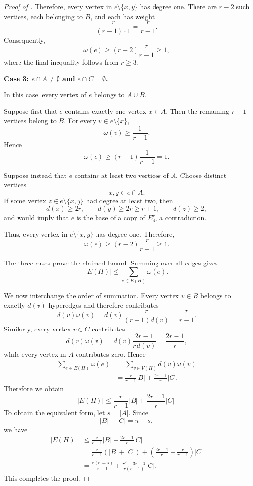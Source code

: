 \documentclass[11pt,a4paper]{article}
\theoremstyle{definition}
\theoremstyle{remark}
\begin{document}
\begin{proof}[Proof of ]
Therefore, every vertex in \(e\setminus\{x,y\}\) has degree one.
There are \(r-2\) such vertices, each belonging to \(B\), and each has
weight
$$
\frac{r}{(r-1)\cdot1}
=
\frac{r}{r-1}.
$$
Consequently,
$$
\omega(e)
\geq
(r-2)\frac{r}{r-1}
\geq1,
$$
where the final inequality follows from \(r\geq3\).

\medskip
\noindent
\textbf{Case 3: \(e\cap A\neq\emptyset\) and \(e\cap C=\emptyset\).}

In this case, every vertex of \(e\) belongs to \(A\cup B\).

Suppose first that \(e\) contains exactly one vertex \(x\in A\). Then
the remaining \(r-1\) vertices belong to \(B\). For every
\(v\in e\setminus\{x\}\),
$$
\omega(v)\geq\frac1{r-1}.
$$
Hence
$$
\omega(e)
\geq
(r-1)\frac1{r-1}
=
1.
$$

Suppose instead that \(e\) contains at least two vertices of \(A\).
Choose distinct vertices
$$
x,y\in e\cap A.
$$
If some vertex
$
z\in e\setminus\{x,y\}
$ had degree at least two, then
$$
d(x)\geq2r,\qquad
d(y)\geq2r\geq r+1,\qquad
d(z)\geq2,
$$
and  would imply that \(e\) is the base of a copy of
\(E_4^r\), a contradiction.

Thus, every vertex in \(e\setminus\{x,y\}\) has degree one. Therefore,
$$
\omega(e)
\geq
(r-2)\frac{r}{r-1}
\geq1.
$$

The three cases prove the claimed bound. Summing over all
edges gives
$$
    |E(H)|
\leq
\sum_{e\in E(H)}\omega(e).
$$


We now interchange the order of summation. Every vertex \(v\in B\)
belongs to exactly \(d(v)\) hyperedges and therefore contributes
$$
d(v)\omega(v)
=
d(v)\frac{r}{(r-1)d(v)}
=
\frac{r}{r-1}.
$$
Similarly, every vertex \(v\in C\) contributes
$$
d(v)\omega(v)
=
d(v)\frac{2r-1}{r\,d(v)}
=
\frac{2r-1}{r},
$$
while every vertex in \(A\) contributes zero. Hence
$$
\begin{aligned}
\sum_{e\in E(H)}\omega(e)
&=
\sum_{v\in V(H)}d(v)\omega(v)\\
&=
\frac{r}{r-1}|B|
+
\frac{2r-1}{r}|C|.
\end{aligned}
$$
Therefore we obtain
$$
|E(H)|
\leq
\frac{r}{r-1}|B|
+
\frac{2r-1}{r}|C|.
$$
To obtain the equivalent form, let $
s=|A|.$
Since
$$
|B|+|C|=n-s,
$$
we have
$$
\begin{aligned}
|E(H)|
&\leq
\frac{r}{r-1}|B|
+
\frac{2r-1}{r}|C|\\
&=
\frac{r}{r-1}(|B|+|C|)
+
\left(
\frac{2r-1}{r}-\frac{r}{r-1}
\right)|C|\\
&=
\frac{r(n-s)}{r-1}
+
\frac{r^2-3r+1}{r(r-1)}|C|.
\end{aligned}
$$
This completes the proof.
\end{proof}
\end{document}
